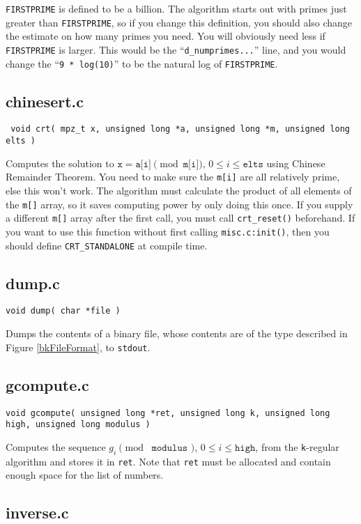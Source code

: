 \documentclass[11pt]{article}
\newcommand{\void}{\textcolor{OliveGreen}{void }}
\newcommand{\ul}{ \textcolor{OliveGreen}{unsigned long }}
\newcommand{\ch}{ \textcolor{OliveGreen}{char }}
\begin{document}
\indent \texttt{FIRSTPRIME} is defined to be a billion. The algorithm starts out with primes just greater than \texttt{FIRSTPRIME}, so if you change this definition,
you should also change the estimate on how many primes you need. You will obviously need less if \texttt{FIRSTPRIME} is larger.
This would be the ``\texttt{d\_numprimes...}'' line, and you would change the ``\texttt{9 * log(10)}'' to be the natural log of \texttt{FIRSTPRIME}.

\subsection{chinesert.c}

{ \tiny
\texttt{ \void crt( mpz\_t x, \ul *a, \ul *m, \ul elts )}
}

Computes the solution to $\texttt{x} = \texttt{a[i]} \pmod{\texttt{m[i]}} \mbox{, } 0 \leq i \leq \texttt{elts}$ using Chinese Remainder Theorem.
You need to make sure the \texttt{m[i]} are all relatively prime, else this won't work.
The algorithm must calculate the product of all elements of the \texttt{m[]} array, so it saves computing power by only doing this once.
If you supply a different \texttt{m[]} array after the first call, you must call \texttt{crt\_reset()} beforehand.
If you want to use this function without first calling \texttt{misc.c:init()}, then you should define \texttt{CRT\_STANDALONE} at compile time.

\subsection{dump.c}

{ \tiny
\texttt{\void dump( \ch *file )}
}

Dumps the contents of a binary file, whose contents are of the type described in Figure \ref{bkFileFormat}, to \texttt{stdout}.

\subsection{gcompute.c}

{\tiny
\texttt{\void gcompute( \ul *ret, \ul k, \ul high, \ul modulus )}
}

Computes the sequence $g_i \pmod{ \texttt{ modulus } }$, $0 \leq i \leq \texttt{high}$, from the \texttt{k}-regular algorithm and stores it in \texttt{ret}.
Note that \texttt{ret} must be allocated and contain enough space for the list of numbers.

\subsection{inverse.c}
\end{document}
